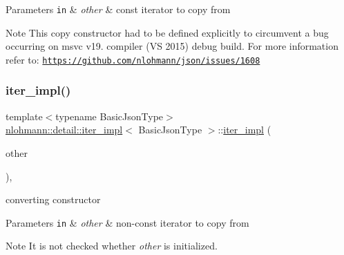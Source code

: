 \begin{DoxyParams}[1]{Parameters}
\mbox{\tt in}  & {\em other} & const iterator to copy from \\
\hline
\end{DoxyParams}
\begin{DoxyNote}{Note}
This copy constructor had to be defined explicitly to circumvent a bug occurring on msvc v19. compiler (VS 2015) debug build. For more information refer to\+: \href{https://github.com/nlohmann/json/issues/1608}{\tt https\+://github.\+com/nlohmann/json/issues/1608} 
\end{DoxyNote}
\mbox{\label{classnlohmann_1_1detail_1_1iter__impl_a867f7eb55091be31b013adb3e46816d3}} 
\subsubsection{\texorpdfstring{iter\+\_\+impl()}{iter\_impl()}\hspace{0.1cm}{\footnotesize\ttfamily [4/4]}}
{\footnotesize\ttfamily template$<$typename Basic\+Json\+Type$>$ \\
\mbox{\hyperlink{classnlohmann_1_1detail_1_1iter__impl}{nlohmann\+::detail\+::iter\+\_\+impl}}$<$ Basic\+Json\+Type $>$\+::\mbox{\hyperlink{classnlohmann_1_1detail_1_1iter__impl}{iter\+\_\+impl}} (\begin{DoxyParamCaption}\item[{const \mbox{\hyperlink{classnlohmann_1_1detail_1_1iter__impl}{iter\+\_\+impl}}$<$ typename std\+::remove\+\_\+const$<$ Basic\+Json\+Type $>$\+::type $>$ \&}]{other }\end{DoxyParamCaption})\hspace{0.3cm}{\ttfamily [inline]}, {\ttfamily [noexcept]}}



converting constructor 


\begin{DoxyParams}[1]{Parameters}
\mbox{\tt in}  & {\em other} & non-\/const iterator to copy from \\
\hline
\end{DoxyParams}
\begin{DoxyNote}{Note}
It is not checked whether {\itshape other} is initialized. 
\end{DoxyNote}


